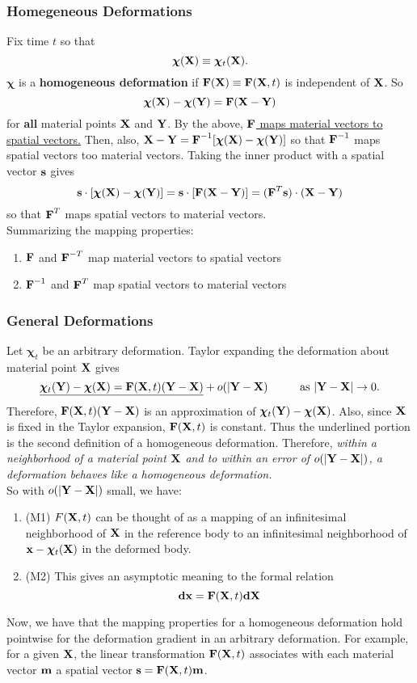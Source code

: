 \documentclass{article}
\newcommand{\Chi}{\boldsymbol{\chi}}
\begin{document}
\subsubsection{Homegeneous Deformations} Fix time $t$ so that $$\Chi(\X) \equiv \Chi_t(\X).$$
$\Chi$ is a \textbf{homogeneous deformation} if $\textbf{F}(\textbf{X}) \equiv \textbf{F}(\textbf{X},t)$ is independent of $\textbf{X}$. So
$$\Chi(\X) - \Chi(\Y) = \F(\X - \Y)$$
for \textbf{all} material points $\textbf{X}$ and $\textbf{Y}$. By the above, \underline{$\textbf{F}$ maps material vectors to spatial vectors.} Then, also, $\X - \Y = \F^{-1}[\Chi(\X) - \Chi(\Y)]$ so that $\textbf{F}^{-1}$ maps spatial vectors too material vectors. Taking the inner product with a spatial vector $\textbf{s}$ gives
$$\s \cdot [\Chi(\X) -\Chi(\Y)] = \s \cdot [\F(\X - \Y)]  = (\F^T\s)\cdot(\X - \Y)$$ so that $\textbf{F}^T$ maps spatial vectors to material vectors.\\
Summarizing the mapping properties:
\begin{enumerate}
	\item $\textbf{F}$ and $\textbf{F}^{-T}$ map material vectors to spatial vectors
	\item $\textbf{F}^{-1}$ and $\textbf{F}^T$ map spatial vectors to material vectors
\end{enumerate}

\subsubsection{General Deformations}
Let $\Chi_t$ be an arbitrary deformation. Taylor expanding the deformation about material point $\textbf{X}$ gives 
$$\underline{\Chi_t(\Y) - \Chi(\X) = \F(\X,t)(\Y - \X)} + o(|\Y - \X) \hspace{1cm} \text{as } |\Y - \X| \to 0.$$ Therefore, $\textbf{F}(\textbf{X},t)(\textbf{Y} - \textbf{X})$ is an approximation of $\Chi_t(\Y) - \Chi(\X)$. Also, since $\textbf{X}$ is fixed in the Taylor expansion, $\textbf{F}(\textbf{X},t)$ is constant. Thus
the underlined portion is the second definition of a homogeneous deformation. Therefore, \emph{within a neighborhood of a material point $\textbf{X}$ and to within an error of $o(|\textbf{Y} -\textbf{X}|)$, a deformation behaves like a homogeneous deformation.}\\
So with $o(|\textbf{Y} - \textbf{X}|)$ small, we have:
\begin{enumerate}
	\item (M1) $F(\textbf{X},t)$ can be thought of as a mapping of an infinitesimal neighborhood of $\textbf{X}$ in the reference body to an infinitesimal neighborhood of $\x - \Chi_t(\X)$ in the deformed body.
	\item (M2) This gives an asymptotic meaning to the formal relation
	$$\textbf{dx} = \textbf{F}(\textbf{X},t)\textbf{dX}$$
\end{enumerate}
Now, we have that the mapping properties for a homogeneous deformation hold pointwise for the deformation gradient in an arbitrary deformation. For example, for a given $\textbf{X}$, the linear transformation $\textbf{F}(\textbf{X},t)$ associates with each material vector $\textbf{m}$ a spatial vector $\textbf{s} = \textbf{F}(\textbf{X},t)\textbf{m}$.
\end{document}
